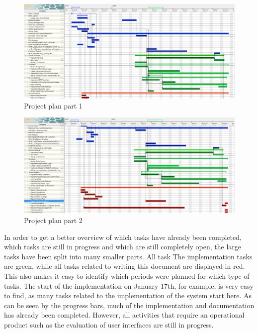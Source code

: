 \begin{landscape}
\thispagestyle{plain}
\begin{figure}[H]
	\centering
	\includegraphics[width =1.4\textwidth]{images/Projectplan1_neu.png}
	\caption{Project plan part 1}
	\label{project-plan1}
\end{figure}
\pagebreak
\thispagestyle{plain}
\begin{figure}[H]
	\centering
	\includegraphics[width =1.4\textwidth]{images/Projectplan2_neu.png}
	\caption{Project plan part 2}
	\label{project-plan2}
\end{figure}
\end{landscape}
In order to get a better overview of which tasks have already been completed, which tasks are still in progress and which are still completely open, the large tasks have been split into many smaller parts. All task The implementation tasks are green, while all tasks related to writing this document are displayed in red.
This also makes it easy to identify which periods were planned for which type of tasks. The start of the implementation on January 17th, for example, is very easy to find, as many tasks related to the implementation of the system start here. As can be seen by the progress bars, much of the implementation and documentation has already been completed. However, all activities that require an operational product such as the evaluation of user interfaces are still in progress.
